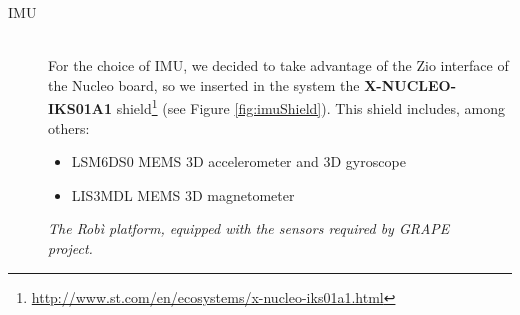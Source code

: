 \begin{description}
	\item[IMU] \hfill \\ For the choice of \ac{IMU}, we decided to take advantage of the Zio interface of the Nucleo board, so we inserted in the system the \textbf{X-NUCLEO-IKS01A1} shield\footnote{\url{http://www.st.com/en/ecosystems/x-nucleo-iks01a1.html}}
	(see Figure \ref{fig:imuShield}).
	This shield includes, among others:
	\begin{itemize}
		\item LSM6DS0 MEMS 3D accelerometer and 3D gyroscope
		\item LIS3MDL MEMS 3D magnetometer
	\end{itemize}
\end{description}



\begin{figure}
	\centering
	\qquad
	\caption{\textit{The Robì platform, equipped with the sensors required by \ac{GRAPE} project.}}
	\label{fig:robiGrape}
\end{figure}

